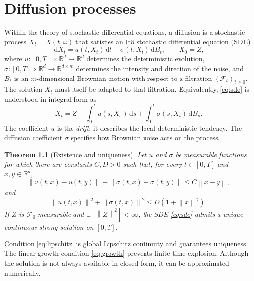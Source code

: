 \documentclass[12pt,a4paper]{report}
\theoremstyle{plain}
\newtheorem{theorem}{Theorem}[chapter]
\theoremstyle{definition}
\newcommand{\R}{\mathbb{R}}
\newcommand{\E}{\mathbb{E}}
\newcommand{\F}{\mathcal{F}}
\newcommand{\dd}{\,\mathrm{d}}
\newcommand{\norm}[1]{\left\|#1\right\|}
\begin{document}
\chapter{Diffusion processes}\label{chap:diffusion}
Within the theory of stochastic differential equations, a diffusion is a stochastic process $X_t=X(t,\omega)$ that satisfies an Itô stochastic differential equation (SDE)
\begin{equation}\dd X_t=u(t,X_t)\dd t+\sigma(t,X_t)\dd B_t,\qquad X_0=Z,\label{eq:sde}\end{equation}
where $u:[0,T]\times\R^d\to\R^d$ determines the deterministic evolution, $\sigma:[0,T]\times\R^d\to\R^{d\times m}$ determines the intensity and direction of the noise, and $B_t$ is an $m$-dimensional Brownian motion with respect to a filtration $(\F_t)_{t\geq0}$. The solution $X_t$ must itself be adapted to that filtration. Equivalently, \eqref{eq:sde} is understood in integral form as
\begin{equation}X_t=Z+\int_0^t u(s,X_s)\dd s+\int_0^t\sigma(s,X_s)\dd B_s.\label{eq:sde-integral}\end{equation}
The coefficient $u$ is the \emph{drift}; it describes the local deterministic tendency. The diffusion coefficient $\sigma$ specifies how Brownian noise acts on the process.

\begin{theorem}[Existence and uniqueness]\label{thm:existence}
Let $u$ and $\sigma$ be measurable functions for which there are constants $C,D>0$ such that, for every $t\in[0,T]$ and $x,y\in\R^d$,
\begin{equation}\norm{u(t,x)-u(t,y)}+\norm{\sigma(t,x)-\sigma(t,y)}\leq C\norm{x-y},\label{eq:lipschitz}\end{equation}
and
\begin{equation}\norm{u(t,x)}^2+\norm{\sigma(t,x)}^2\leq D(1+\norm{x}^2).\label{eq:growth}\end{equation}
If $Z$ is $\F_0$-measurable and $\E[\norm Z^2]<\infty$, the SDE \eqref{eq:sde} admits a unique continuous strong solution on $[0,T]$.
\end{theorem}
Condition \eqref{eq:lipschitz} is global Lipschitz continuity and guarantees uniqueness. The linear-growth condition \eqref{eq:growth} prevents finite-time explosion. Although the solution is not always available in closed form, it can be approximated numerically.
\end{document}
